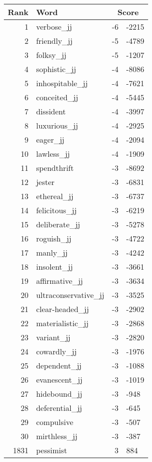 \begin{longtable}[!htbp]{| rlr@{.}l |}
    \hline
    \textbf{Rank} & \textbf{Word} & \multicolumn{2}{c|}{\textbf{Score}} \\
    \hline
    \endhead
    1 & verbose\_jj & -6 & -2215 \\
    2 & friendly\_jj & -5 & -4789 \\
    3 & folksy\_jj & -5 & -1207 \\
    4 & sophistic\_jj & -4 & -8086 \\
    5 & inhospitable\_jj & -4 & -7621 \\
    6 & conceited\_jj & -4 & -5445 \\
    7 & dissident & -4 & -3997 \\
    8 & luxurious\_jj & -4 & -2925 \\
    9 & eager\_jj & -4 & -2094 \\
    10 & lawless\_jj & -4 & -1909 \\
    11 & spendthrift & -3 & -8692 \\
    12 & jester & -3 & -6831 \\
    13 & ethereal\_jj & -3 & -6737 \\
    14 & felicitous\_jj & -3 & -6219 \\
    15 & deliberate\_jj & -3 & -5278 \\
    16 & roguish\_jj & -3 & -4722 \\
    17 & manly\_jj & -3 & -4242 \\
    18 & insolent\_jj & -3 & -3661 \\
    19 & affirmative\_jj & -3 & -3634 \\
    20 & ultraconservative\_jj & -3 & -3525 \\
    21 & clear-headed\_jj & -3 & -2902 \\
    22 & materialistic\_jj & -3 & -2868 \\
    23 & variant\_jj & -3 & -2820 \\
    24 & cowardly\_jj & -3 & -1976 \\
    25 & dependent\_jj & -3 & -1088 \\
    26 & evanescent\_jj & -3 & -1019 \\
    27 & hidebound\_jj & -3 & -948 \\
    28 & deferential\_jj & -3 & -645 \\
    29 & compulsive & -3 & -507 \\
    30 & mirthless\_jj & -3 & -387 \\
    1831 & pessimist & 3 & 884 \\

\end{longtable}

